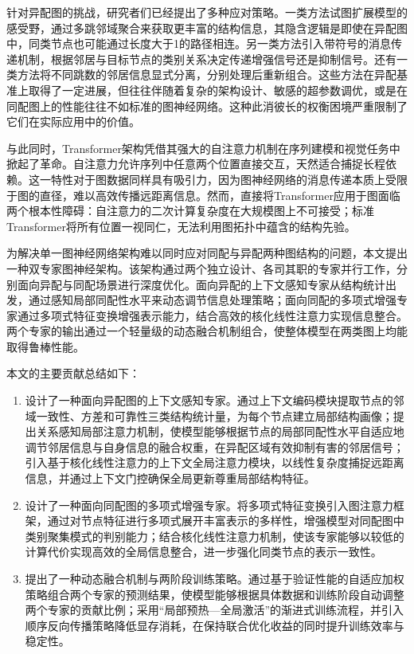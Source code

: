 \documentclass[a4paper,10pt]{article}
\begin{document}
针对异配图的挑战，研究者们已经提出了多种应对策略。一类方法试图扩展模型的感受野，通过多跳邻域聚合来获取更丰富的结构信息，其隐含逻辑是即使在异配图中，同类节点也可能通过长度大于1的路径相连。另一类方法引入带符号的消息传递机制，根据邻居与目标节点的类别关系决定传递增强信号还是抑制信号。还有一类方法将不同跳数的邻居信息显式分离，分别处理后重新组合。这些方法在异配基准上取得了一定进展，但往往伴随着复杂的架构设计、敏感的超参数调优，或是在同配图上的性能往往不如标准的图神经网络。这种此消彼长的权衡困境严重限制了它们在实际应用中的价值。

与此同时，Transformer架构凭借其强大的自注意力机制在序列建模和视觉任务中掀起了革命。自注意力允许序列中任意两个位置直接交互，天然适合捕捉长程依赖。这一特性对于图数据同样具有吸引力，因为图神经网络的消息传递本质上受限于图的直径，难以高效传播远距离信息。然而，直接将Transformer应用于图面临两个根本性障碍：自注意力的二次计算复杂度在大规模图上不可接受；标准Transformer将所有位置一视同仁，无法利用图拓扑中蕴含的结构先验。

为解决单一图神经网络架构难以同时应对同配与异配两种图结构的问题，本文提出一种双专家图神经架构。该架构通过两个独立设计、各司其职的专家并行工作，分别面向异配与同配场景进行深度优化。面向异配的上下文感知专家从结构统计出发，通过感知局部同配性水平来动态调节信息处理策略；面向同配的多项式增强专家通过多项式特征变换增强表示能力，结合高效的核化线性注意力实现信息整合。两个专家的输出通过一个轻量级的动态融合机制组合，使整体模型在两类图上均能取得鲁棒性能。

本文的主要贡献总结如下：

\begin{enumerate}[label=(\arabic*)]
\item 设计了一种面向异配图的上下文感知专家。通过上下文编码模块提取节点的邻域一致性、方差和可靠性三类结构统计量，为每个节点建立局部结构画像；提出关系感知局部注意力机制，使模型能够根据节点的局部同配性水平自适应地调节邻居信息与自身信息的融合权重，在异配区域有效抑制有害的邻居信号；引入基于核化线性注意力的上下文全局注意力模块，以线性复杂度捕捉远距离信息，并通过上下文门控确保全局更新尊重局部结构特征。

\item 设计了一种面向同配图的多项式增强专家。将多项式特征变换引入图注意力框架，通过对节点特征进行多项式展开丰富表示的多样性，增强模型对同配图中类别聚集模式的判别能力；结合核化线性注意力机制，使该专家能够以较低的计算代价实现高效的全局信息整合，进一步强化同类节点的表示一致性。

\item 提出了一种动态融合机制与两阶段训练策略。通过基于验证性能的自适应加权策略组合两个专家的预测结果，使模型能够根据具体数据和训练阶段自动调整两个专家的贡献比例；采用“局部预热—全局激活”的渐进式训练流程，并引入顺序反向传播策略降低显存消耗，在保持联合优化收益的同时提升训练效率与稳定性。
\end{enumerate}
\end{document}
